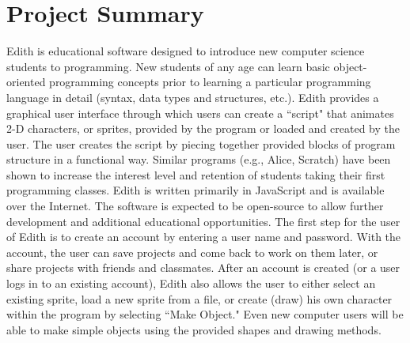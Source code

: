 \documentclass[a4paper]{article}
\begin{document}
\section{Project Summary}
Edith is educational software designed to introduce new computer science students to programming. New students of any age can learn basic object-oriented programming concepts prior to learning a particular programming language in detail (syntax, data types and structures, etc.). Edith provides a graphical user interface through which users can create a ``script" that animates 2-D characters, or sprites, provided by the program or loaded and created by the user. The user creates the script by piecing together provided blocks of program structure in a functional way. Similar programs (e.g., Alice, Scratch) have been shown to increase the interest level and retention of students taking their first programming classes. Edith is written primarily in JavaScript and is available over the Internet. The software is expected to be open-source to allow further development and additional educational opportunities. \newline \newline 
The first step for the user of Edith is to create an account by entering a user name and password. With the account, the user can save projects and come back to work on them later, or share projects with friends and classmates. After an account is created (or a user logs in to an existing account), Edith also allows the user to either select an existing sprite, load a new sprite from a file, or create (draw) his own character within the program by selecting ``Make Object." Even new computer users will be able to make simple objects using the provided shapes and drawing methods. \newline \newline 
\end{document}
